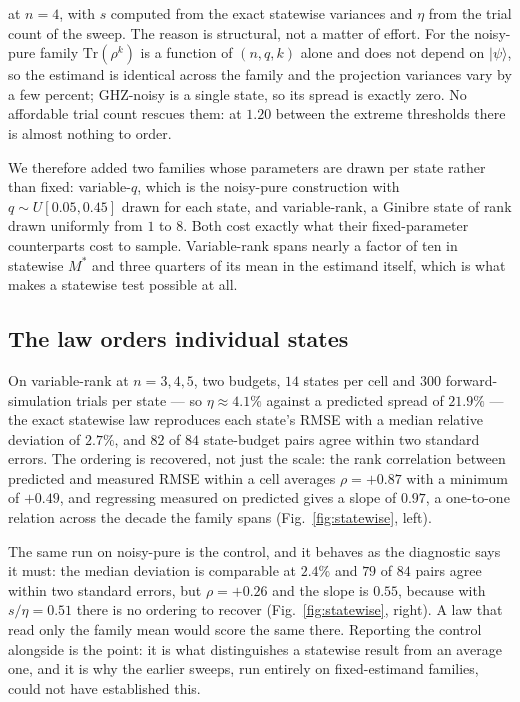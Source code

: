 \noindent
at \(n = 4\), with \(s\) computed from the exact statewise variances and \(\eta\) from the trial
count of the sweep. The reason is structural, not a matter of effort. For the noisy-pure family
\(\mathrm{Tr}(\rho^k)\) is a function of \((n, q, k)\) alone and does not depend on
\(|\psi\rangle\), so the estimand is identical across the family and the projection variances
vary by a few percent; GHZ-noisy is a single state, so its spread is exactly zero. No affordable
trial count rescues them: at \(1.20\) between the extreme thresholds there is almost nothing to
order.

We therefore added two families whose parameters are drawn per state rather than fixed:
variable-\(q\), which is the noisy-pure construction with \(q \sim U[0.05, 0.45]\) drawn for each
state, and variable-rank, a Ginibre state of rank drawn uniformly from \(1\) to \(8\). Both cost
exactly what their fixed-parameter counterparts cost to sample. Variable-rank spans nearly a
factor of ten in statewise \(M^*\) and three quarters of its mean in the estimand itself, which
is what makes a statewise test possible at all.

\hypertarget{the-law-orders-individual-states}{%
\subsection{The law orders individual states}\label{the-law-orders-individual-states}}

On variable-rank at \(n = 3, 4, 5\), two budgets, \(14\) states per cell and \(300\)
forward-simulation trials per state --- so \(\eta \approx 4.1\%\) against a predicted spread of
\(21.9\%\) --- the exact statewise law reproduces each state's RMSE with a median relative
deviation of \(2.7\%\), and \(82\) of \(84\) state-budget pairs agree within two standard errors.
The ordering is recovered, not just the scale: the rank correlation between predicted and measured
RMSE within a cell averages \(\rho = +0.87\) with a minimum of \(+0.49\), and regressing measured
on predicted gives a slope of \(0.97\), a one-to-one relation across the decade the family spans
(Fig.~\ref{fig:statewise}, left).

The same run on noisy-pure is the control, and it behaves as the diagnostic says it must: the
median deviation is comparable at \(2.4\%\) and \(79\) of \(84\) pairs agree within two standard
errors, but \(\rho = +0.26\) and the slope is \(0.55\), because with \(s/\eta = 0.51\) there is no
ordering to recover (Fig.~\ref{fig:statewise}, right). A law that read only the family mean would
score the same there. Reporting the control alongside is the point: it is what distinguishes a
statewise result from an average one, and it is why the earlier sweeps, run entirely on
fixed-estimand families, could not have established this.

